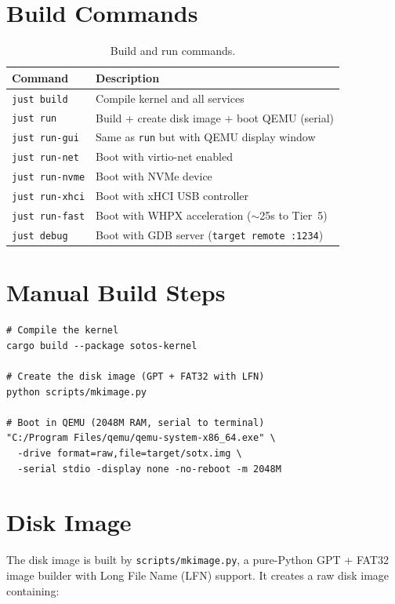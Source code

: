 \documentclass[11pt,a4paper,twoside]{report}
\theoremstyle{definition}
\newcommand{\file}[1]{\texttt{#1}}
\begin{document}
\section{Build Commands}

\begin{table}[H]
\centering
\caption{Build and run commands.}
\begin{tabularx}{\textwidth}{l X}
\toprule
\textbf{Command} & \textbf{Description} \\
\midrule
\texttt{just build}     & Compile kernel and all services \\
\texttt{just run}       & Build + create disk image + boot QEMU (serial) \\
\texttt{just run-gui}   & Same as \texttt{run} but with QEMU display window \\
\texttt{just run-net}   & Boot with virtio-net enabled \\
\texttt{just run-nvme}  & Boot with NVMe device \\
\texttt{just run-xhci}  & Boot with xHCI USB controller \\
\texttt{just run-fast}  & Boot with WHPX acceleration (${\sim}$25s to Tier~5) \\
\texttt{just debug}     & Boot with GDB server (\texttt{target remote :1234}) \\
\bottomrule
\end{tabularx}
\end{table}

\section{Manual Build Steps}

\begin{lstlisting}[language={},caption={Manual build and boot sequence.}]
# Compile the kernel
cargo build --package sotos-kernel

# Create the disk image (GPT + FAT32 with LFN)
python scripts/mkimage.py

# Boot in QEMU (2048M RAM, serial to terminal)
"C:/Program Files/qemu/qemu-system-x86_64.exe" \
  -drive format=raw,file=target/sotx.img \
  -serial stdio -display none -no-reboot -m 2048M
\end{lstlisting}

\section{Disk Image}

The disk image is built by \file{scripts/mkimage.py}, a pure-Python GPT +
FAT32 image builder with Long File Name (LFN) support. It creates a raw
disk image containing:
\end{document}
